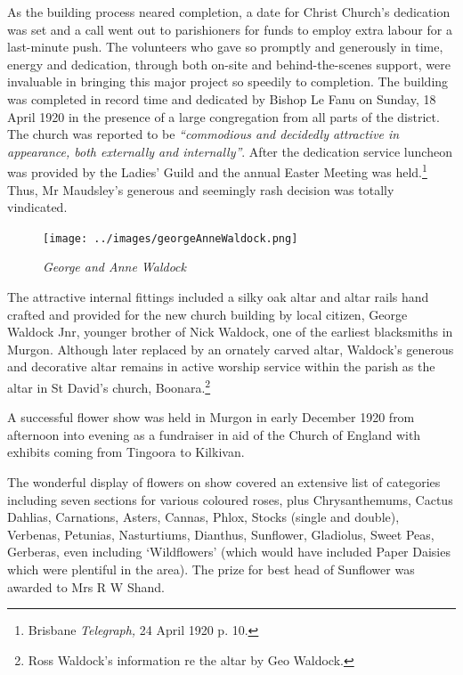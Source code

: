 As the building process neared completion, a date for Christ Church's dedication was set and a call went out to parishioners for funds to employ extra labour for a last-minute push. The volunteers who gave so promptly and generously in time, energy and dedication, through both on-site and behind-the-scenes support, were invaluable in bringing this major project so speedily to completion. The building was completed in record time and dedicated by Bishop Le Fanu on Sunday, 18 April 1920 in the presence of a large congregation from all parts of the district. The church was reported to be \emph{``commodious and decidedly attractive in appearance, both externally and internally''}. After the dedication service luncheon was provided by the Ladies' Guild and the annual Easter Meeting was held.\footnote{Brisbane \emph{Telegraph,} 24 April 1920 p. 10.} Thus, Mr Maudsley's generous and seemingly rash decision was totally vindicated.








\begin{figure}
\begin{center}
\texttt{[image: ../images/georgeAnneWaldock.png]}
\caption{\itshape George and Anne Waldock}
\end{center}
\end{figure}




The attractive internal fittings included a silky oak altar and altar rails hand crafted and provided for the new church building by local citizen, George Waldock Jnr, younger brother of Nick Waldock, one of the earliest blacksmiths in Murgon. Although later replaced by an ornately carved altar, Waldock's generous and decorative altar remains in active worship service within the parish as the altar in St David's church, Boonara.\footnote{Ross Waldock's information re the altar by Geo Waldock.}


A successful flower show was held in Murgon in early December 1920 from afternoon into evening as a fundraiser in aid of the Church of England with exhibits coming from Tingoora to Kilkivan.



The wonderful display of flowers on show covered an extensive list of categories including seven sections for various coloured roses, plus Chrysanthemums, Cactus Dahlias, Carnations, Asters, Cannas, Phlox, Stocks (single and double), Verbenas, Petunias, Nasturtiums, Dianthus, Sunflower, Gladiolus, Sweet Peas, Gerberas, even including `Wildflowers' (which would have included Paper Daisies which were plentiful in the area). The prize for best head of Sunflower was awarded to Mrs R W Shand.



